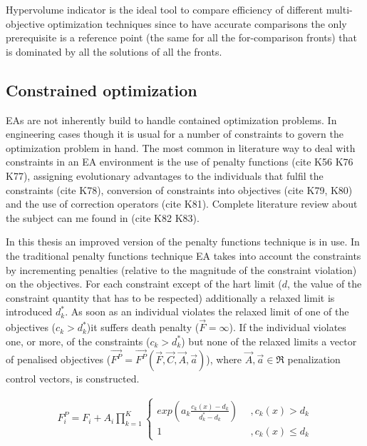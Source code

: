 Hypervolume indicator is the ideal tool to compare efficiency of different multi-objective optimization techniques since to have accurate comparisons the only prerequisite is a reference point (the same for all the for-comparison fronts) that is dominated by all the solutions of all the fronts.   

\subsection{Constrained optimization}
EAs are not inherently build to handle contained optimization problems. In engineering cases though it is usual for a number of constraints to govern the optimization problem in hand. The most common in literature way to deal with constraints in an EA environment is the use of penalty functions (cite K56 K76 K77), assigning evolutionary advantages to the individuals that fulfil the constraints (cite K78), conversion of constraints into objectives (cite K79, K80) and the use of correction operators (cite K81). Complete literature review about the subject can me found in (cite K82 K83).

In this thesis an improved version of the penalty functions technique is in use. In the traditional penalty functions technique EA takes into account the constraints by  incrementing penalties (relative to the magnitude of the constraint violation) on the objectives. For each constraint except of the hart limit ($d$, the value of the constraint quantity that has to be respected) additionally a relaxed limit is introduced $d_k^*$. As soon as an individual violates the relaxed limit of one of the objectives ($c_k>d_k^*$)it suffers death penalty ($\overrightarrow{F} = \infty$). If the individual violates one, or more, of the constraints ($c_k>d_k^*$) but none of the relaxed limits a vector of penalised objectives ($\overrightarrow{F^P}=\overrightarrow{F^P}(\overrightarrow{F},\overrightarrow{C},\overrightarrow{A},\overrightarrow{a})$), where $\overrightarrow{A},\overrightarrow{a} \in \Re$ penalization control vectors, is constructed. 

\begin{eqnarray}
	F_i^P=F_i+A_i \prod _{k=1}^K{\left\{ \begin{array}{ll}
    exp(a_k\frac{c_k(x)-d_k}{d_k^* -d_k}) & ~~,c_k(x)>d_k\\
    1 & ~~,c_k(x)\leq d_k\end{array} \right. }
    \label{penal}
\end{eqnarray}  

